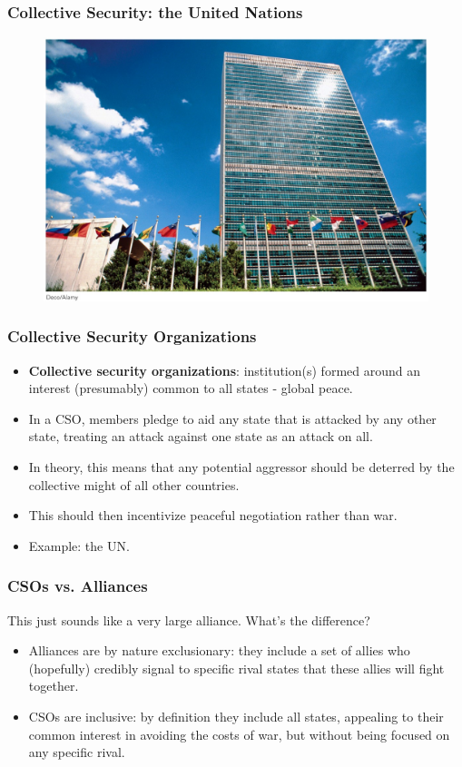 \documentclass[handout]{beamer}
\begin{document}
\begin{frame} 
	\frametitle{\LARGE{Collective Security: the United Nations}}
	\begin{figure}[ht!]
		\centering
		\includegraphics[width=\textwidth,height=\textheight,keepaspectratio]{UNhq.jpg}
	\end{figure}
\end{frame}	

\begin{frame} 
	\frametitle{\LARGE{Collective Security Organizations}}
		\begin{itemize}
			\item \textbf{Collective security organizations}: institution(s) formed around an interest (presumably) common to all states - global peace.  \pause 
			\item In a CSO, members pledge to aid any state that is attacked by any other state, treating an attack against one state as an attack on all. \pause
			\item In theory, this means that any potential aggressor should be deterred by the collective might of all other countries. \pause
			\item This should then incentivize peaceful negotiation rather than war. \pause
			\item Example: the UN.
		\end{itemize}
\end{frame}


\begin{frame} 
	\frametitle{\LARGE{CSOs vs. Alliances}}
This just sounds like a very large alliance. What's the difference?
	\begin{itemize}
		\item Alliances are by nature exclusionary: they include a set of allies who (hopefully) credibly signal to specific rival states that these allies will fight together. \pause
		\item CSOs are inclusive: by definition they include all states, appealing to their common interest in avoiding the costs of war, but without being focused on any specific rival.
	\end{itemize}
\end{frame}
\end{document}

